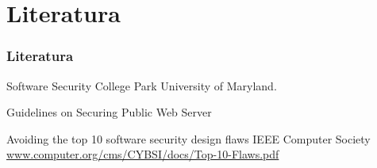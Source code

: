 \documentclass{beamer}
\begin{document}
\section<presentation>{Literatura} 
\begin{frame}
  \frametitle<presentation>{Literatura}
    
  \begin{thebibliography}{10}

  \bibitem{}
    Software Security
     \newblock  College Park University of Maryland.
   
    \bibitem{}
   Guidelines on Securing Public Web Server
    \newblock
   
 

  \bibitem{}
    Avoiding the top 10 software security design flaws
    \newblock IEEE Computer Society
    \newblock  \url{www.computer.org/cms/CYBSI/docs/Top-10-Flaws.pdf}
   
  \end{thebibliography}
\end{frame}
\end{document}
